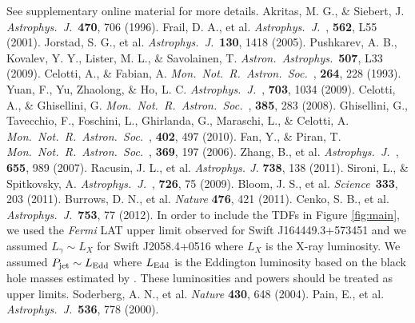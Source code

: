 \documentclass[12pt]{article}
\def\aap{{\it Astron.~Astrophys.}~}
\def\apj{{\it Astrophys.~J.}~}
\def\mnras{{\it Mon.~Not.~R.~Astron.~Soc.}~}
\def\sci{{\it Science}~}
\begin{document}
\begin{thebibliography}{99}
 See supplementary online material for more details. 
 Akritas, M. G., \& Siebert, J.  \apj \textbf{470}, 706 (1996).	
 Frail, D. A., et al. \apj, {\bf 562}, L55 (2001).	
 Jorstad, S. G., et al. \apj 	\textbf{130}, 1418 (2005).	
 Pushkarev, A. B., Kovalev, Y. Y., Lister, M. L., \& Savolainen, T. \aap 	\textbf{507}, L33 (2009).	
 Celotti, A., \& Fabian, A. \mnras, {\bf 264}, 228 (1993).	
 Yuan, F., Yu, Zhaolong, \& Ho, L. C. \apj, {\bf 703}, 1034 (2009).	
 Celotti, A., \& Ghisellini, G. \mnras, {\bf 385}, 283 (2008).	
 Ghisellini, G., Tavecchio, F., Foschini, L., Ghirlanda, G., Maraschi, L., \& Celotti, A. \mnras, {\bf 402}, 497 (2010).	
 Fan, Y., \& Piran, T. \mnras, {\bf 369}, 197 (2006).	
 Zhang, B., et al. \apj, {\bf 655}, 989 (2007).	
 Racusin, J. L., et al.  \emph{Astrophys. J.} \textbf{738}, 138 (2011).	
 Sironi, L., \& Spitkovsky, A. \apj, {\bf 726}, 75 (2009).	
 Bloom, J. S., et al.  \sci 	\textbf{333}, 203 (2011).	
 Burrows, D. N., et al.  \emph{Nature} 	\textbf{476}, 421 (2011).	
 Cenko, S. B., et al.  \apj  {\bf 753}, 77 (2012).	
 In order to include the TDFs in Figure \ref{fig:main}, we used the \emph{Fermi} LAT upper limit \cite{burrows11} observed for Swift J164449.3+573451 and we assumed $L_\gamma \sim L_X$ for Swift J2058.4+0516 \cite{cenko12} where  $L_X$ is the X-ray luminosity. We assumed $P_{\rm jet} \sim L_{\rm Edd}$ where $L_{\rm Edd}$ is the Eddington luminosity based on the black hole masses estimated by . These luminosities and powers should be treated as upper limits. 	
 Soderberg, A. N., et al.  \emph{Nature} 	\textbf{430}, 648 (2004).	
 Pain, E., et al. \apj {\bf 536}, 778 (2000).	

\end{thebibliography}
\end{document}
